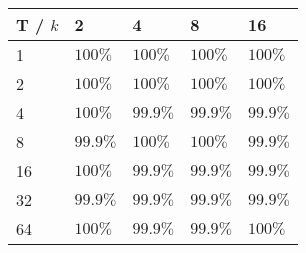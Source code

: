 \documentclass{article}
\begin{document}
    \begin{minipage}{0.45\textwidth}
        \begin{table}[H]
            \begin{center}
                \begin{tabular}[c]{|l|l|l|l|l|}
                    \hline
                    T / \( k \) & 2& 4 & 8 & 16   \\
                    \hline
                    1&\( 100\% \)&\( 100\% \)& \( 100\% \)&\( 100\% \) \\
                    \hline
                    2&\( 100\% \)&\( 100\% \)& \( 100\% \)&\( 100\% \) \\
                    \hline
                    4&\( 100\% \)&\( 99.9\% \)& \( 99.9\% \)&\( 99.9\% \) \\
                    \hline
                    8&\( 99.9\% \)&\( 100\% \)& \( 100\% \)&\( 99.9\% \) \\
                    \hline
                    16&\( 100\% \)&\( 99.9\% \)& \( 99.9\% \)&\( 99.9\% \) \\
                    \hline
                    32&\( 99.9\% \)&\( 99.9\% \)&\( 99.9\% \)&\( 99.9\% \)  \\
                    \hline
                    64&\( 100\% \)&\( 99.9\% \)&\( 99.9\% \)&\( 100\% \)  \\
                    \hline
                \end{tabular}
            \end{center}
        \end{table}
    \end{minipage}
\end{document}
